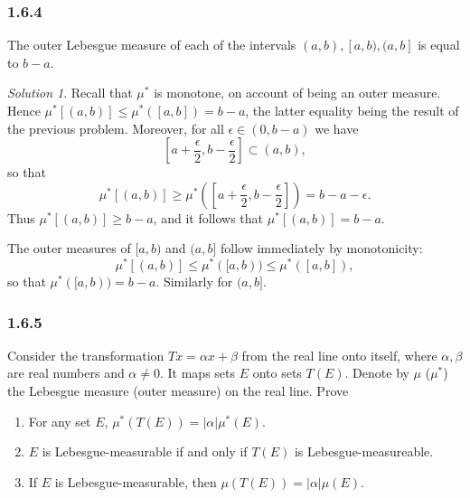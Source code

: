 \documentclass{report}
\theoremstyle{remark}
\newtheorem*{solution}{Solution}
\begin{document}
\subsubsection*{1.6.4}
The outer Lebesgue measure of each of the intervals $(a,b), [a,b), (a,b]$ is equal to $b-a$.

\begin{solution}
  Recall that $\mu^*$ is monotone, on account of being an outer measure. Hence $\mu^*[(a,b)] \le \mu^*([a,b]) = b - a$, the latter equality being the result of the previous problem. Moreover, for all $\epsilon \in (0, b-a)$ we have
  \begin{equation*}
    \left[ a + \frac{\epsilon}{2}, b - \frac{\epsilon}{2} \right] \subset (a,b),
  \end{equation*}
  so that
  \begin{equation*}
    \mu^*[(a,b)] \ge \mu^* \left( \left[ a + \frac{\epsilon}{2}, b - \frac{\epsilon}{2} \right] \right) = b - a - \epsilon.
  \end{equation*}
  Thus $\mu^*[(a,b)] \ge b - a$, and it follows that $\mu^*[(a,b)] = b - a$.

  The outer measures of $[a,b)$ and $(a,b]$ follow immediately by monotonicity:
  \begin{equation*}
    \mu^*[(a,b)] \le \mu^*([a,b)) \le \mu^*([a,b]),
  \end{equation*}
  so that $\mu^*([a,b)) = b - a$. Similarly for $(a,b]$.
\end{solution}

\subsubsection*{1.6.5}
Consider the transformation $T x = \alpha x + \beta$ from the real line onto itself, where $\alpha, \beta$ are real numbers and $\alpha \ne 0$. It maps sets $E$ onto sets $T(E)$. Denote by $\mu$ ($\mu^*$) the Lebesgue measure (outer measure) on the real line. Prove
\begin{enumerate}[label=(\alph*)]
  \item For any set $E$, $\mu^*(T(E)) = |\alpha| \mu^*(E)$.
  \item $E$ is Lebesgue-measurable if and only if $T(E)$ is Lebesgue-measureable.
  \item If $E$ is Lebesgue-measurable, then $\mu(T(E)) = |\alpha| \mu(E)$.
\end{enumerate}
\end{document}

